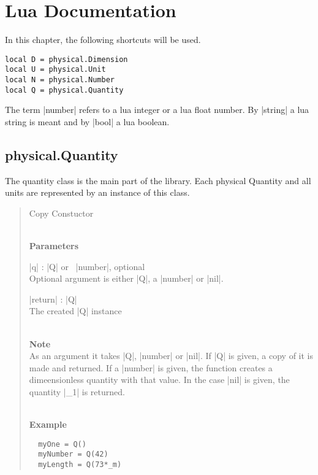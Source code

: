 \documentclass{ltxdoc}
\begin{document}
\newcommand{\subtitle}[1]{\noindent \\\textbf{#1}}

\lstset{language=Lua}




\newpage
\section{Lua Documentation}

In this chapter, the following shortcuts will be used.
\begin{lstlisting}
local D = physical.Dimension
local U = physical.Unit
local N = physical.Number
local Q = physical.Quantity
\end{lstlisting}

The term |number| refers to a lua integer or a lua float number. By |string| a lua string is meant and by |bool| a lua boolean.






\subsection{physical.Quantity}
The quantity class is the main part of the library. Each physical Quantity and all units are represented by an instance of this class.


\begin{quote}
  Copy Constuctor

  \subtitle{Parameters}
  \begin{description}
    \item |q| : |Q| or \ |number|, optional\\
      Optional argument is either |Q|, a |number| or |nil|.

    \item |return| : |Q|\\
      The created |Q| instance
  \end{description}

  \subtitle{Note}\\
  As an argument it takes |Q|, |number| or |nil|. If |Q| is given, a copy of it is made and returned. If a |number| is given, the function creates a dimeensionless quantity with that value. In the case |nil| is given, the quantity |_1| is returned.

  \subtitle{Example}
  \begin{lstlisting}
  myOne = Q()
  myNumber = Q(42)
  myLength = Q(73*_m)
  \end{lstlisting}
\end{quote}
\end{document}
